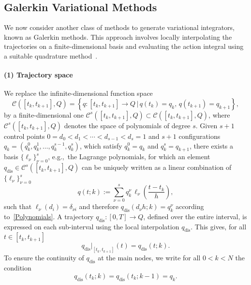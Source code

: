 \documentclass[a4paper,10pt,reqno]{amsart}
\theoremstyle{definition}
\newcommand{\Flder}{\rightarrow}
\newcommand{\dis}{\text{dis}}
\begin{document}
\subsection{Galerkin Variational Methods}\label{HO-Action}
We now consider another class of methods to generate variational integrators, known as Galerkin methods. This approach involves locally interpolating the trajectories on a finite-dimensional basis and evaluating the action integral using a suitable quadrature method~\cite{HaLe13,MaWe,SinaSaake}.

\paragraph{(1) Trajectory space} We replace the infinite-dimensional function space
$$\mathcal{C}([t_k,t_{k+1}],Q)=\left\{ q:[t_k,t_{k+1}]\Flder Q\,|\, q(t_k)=q_k,\,q(t_{k+1})=q_{k+1} \right\},$$
by a finite-dimensional one  $\mathcal{C}^s([t_k,t_{k+1}],Q)\subset \mathcal{C}([t_k,t_{k+1}],Q)$, where $\mathcal{C}^s([t_k,t_{k+1}],Q)$ denotes the space of polynomials of degree $s$.  Given $s+1$ control points $0=d_0<d_1<\cdots<d_{s-1}<d_s=1$ and $s+1$ configurations $q_k=(q_k^0,q_k^1,\ldots,q_k^{s-1},q_k^s)$, which satisfy $q_k^0=q_k$ and $q_k^{s}=q_{k+1}$, there exists a basis $\{\ell_\nu\}_{\nu=0}^s$, e.g.,~the Lagrange polynomials, for which an element $q_\dis^{} \in \mathcal{C}^s([t_k,t_{k+1}],Q)$ can be uniquely written as   a  linear combination of $\{\ell_\nu\}_{\nu=0}^s$ 
\begin{equation}\label{Polynomials}
q(t;k):=\sum_{\nu=0}^sq_k^{\nu}\,\ell_{\nu}\left(\frac{t-t_k}{h}\right),
\end{equation}
 such that $\ell_{\nu}(d_i)= \delta_{\nu i}$ and therefore $q_\dis^{} (d_\nu h;k)=q_k^\nu$ according to~\eqref{Polynomials}.  A trajectory $q_\dis^{}  : [0, T ] \to Q$, defined over the entire interval, is expressed on each sub-interval using the local interpolation $q_\dis^{}$. This gives, for all $t \in [t_k , t_{k+1}]$
\[q_\dis^{}|_{[t_k , t_{k+1}]} (t) = q_\dis^{} (t;k).\]
To ensure the continuity of $q_\dis^{}$ at the main nodes, we write for all $0 < k < N$ the condition
\[q_\dis^{} (t_k;k) = q_\dis^{} (t_k;k-1)=q_k.\]
\end{document}
